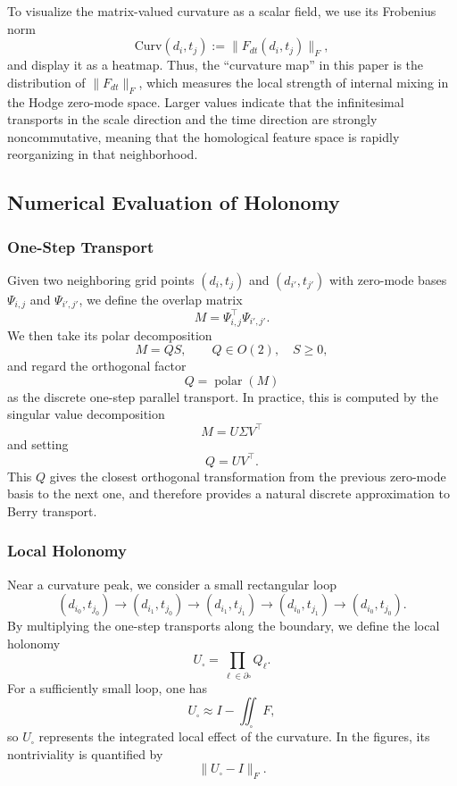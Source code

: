 \documentclass[pdflatex,sn-mathphys-num]{sn-jnl}%
\theoremstyle{thmstyleone}%
\theoremstyle{thmstyletwo}%
\theoremstyle{thmstylethree}%
\begin{document}
\begin{appendices}
To visualize the matrix-valued curvature as a scalar field, we use its Frobenius norm
\[
\mathrm{Curv}(d_i,t_j)
:=
\|F_{dt}(d_i,t_j)\|_F,
\]
and display it as a heatmap. Thus, the ``curvature map'' in this paper is the distribution of \(\|F_{dt}\|_F\), which measures the local strength of internal mixing in the Hodge zero-mode space. Larger values indicate that the infinitesimal transports in the scale direction and the time direction are strongly noncommutative, meaning that the homological feature space is rapidly reorganizing in that neighborhood.

\subsection{Numerical Evaluation of Holonomy}

\subsubsection{One-Step Transport}

Given two neighboring grid points \((d_i,t_j)\) and \((d_{i'},t_{j'})\) with zero-mode bases \(\Psi_{i,j}\) and \(\Psi_{i',j'}\), we define the overlap matrix
\[
M=\Psi_{i,j}^\top \Psi_{i',j'}.
\]
We then take its polar decomposition
\[
M=QS,
\qquad
Q\in O(2),\quad S\ge 0,
\]
and regard the orthogonal factor
\[
Q=\operatorname{polar}(M)
\]
as the discrete one-step parallel transport. In practice, this is computed by the singular value decomposition
\[
M=U\Sigma V^\top
\]
and setting
\[
Q=UV^\top.
\]
This \(Q\) gives the closest orthogonal transformation from the previous zero-mode basis to the next one, and therefore provides a natural discrete approximation to Berry transport.

\subsubsection{Local Holonomy}

Near a curvature peak, we consider a small rectangular loop
\[
(d_{i_0},t_{j_0})
\to
(d_{i_1},t_{j_0})
\to
(d_{i_1},t_{j_1})
\to
(d_{i_0},t_{j_1})
\to
(d_{i_0},t_{j_0}).
\]
By multiplying the one-step transports along the boundary, we define the local holonomy
\[
U_{\square}
=
\prod_{\ell\in \partial \square} Q_\ell.
\]
For a sufficiently small loop, one has
\[
U_{\square}\approx I-\iint_{\square}F,
\]
so \(U_{\square}\) represents the integrated local effect of the curvature. In the figures, its nontriviality is quantified by
\[
\|U_{\square}-I\|_F.
\]


\end{appendices}
\end{document}

